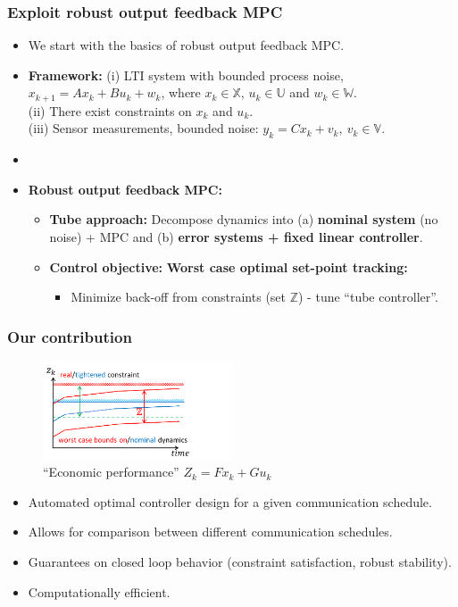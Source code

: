 \documentclass{beamer}
\begin{document}
\begin{frame}
 \frametitle{Exploit robust output feedback MPC}
 \begin{itemize}
  \item We start with the basics of robust output feedback MPC.
  \item \textbf{Framework:} (i) LTI system with bounded process noise, $x_{k+1} = A x_k + B u_k + w_k$,
  where $x_k \in \mathbb{X}$, $u_k \in \mathbb{U}$ and $w_k \in \mathbb{W}$.\\
  (ii) There exist constraints on $x_k$ and $u_k$.\\
  (iii) Sensor measurements, bounded noise: $y_k = C x_k + v_k, \ v_k \in \mathbb{V}$.
  \item[]
  \item \textbf{Robust output feedback MPC:}
  \begin{itemize}
   \item \textbf{Tube approach:} Decompose dynamics into (a) \textbf{nominal system} (no noise) + MPC
   and (b) \textbf{error systems + fixed linear controller}.
   \item \textbf{Control objective:} \textbf{Worst case optimal set-point tracking:}
   \begin{itemize}
    \item Minimize back-off from constraints (set $\mathbb{Z}$) - tune ``tube controller''.
   \end{itemize}
  \end{itemize}
 \end{itemize}
\end{frame}
\begin{frame}
 \frametitle{Our contribution}
 \vspace*{-.3in}
 \begin{figure}
\centering
\includegraphics[width=0.5\textwidth, height = .3\textheight]{tubes.png}
  \caption{{\footnotesize ``Economic performance'' $Z_k = F x_k + G u_k$}} 
\end{figure}
\vspace*{-.3in}
\begin{itemize}
 \item Automated optimal controller design for a given communication schedule.
 \item Allows for comparison between different communication schedules.
 \item Guarantees on closed loop behavior (constraint satisfaction, robust stability).
 \item Computationally efficient.
\end{itemize}

\end{frame}
\end{document}
